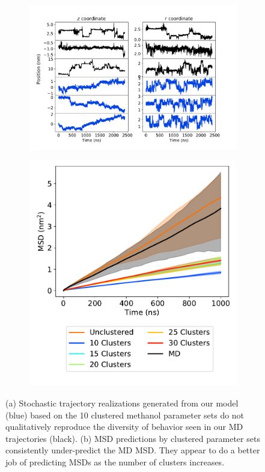 \documentclass[journal=jpcbfk,manuscript=article]{achemso}
\begin{document}
  \begin{figure}
  \centering
  \begin{subfigure}{0.63\textwidth}
  \includegraphics[width=\textwidth]{qualitative_clustered_MET_10.pdf}
  \caption{}\label{fig:qualitative_clustered_MET}
  \end{subfigure}
  \begin{subfigure}{0.35\textwidth}
  \vspace{2.25em}
  \includegraphics[width=\textwidth]{msd_nclusters.pdf}
  \caption{}\label{fig:clustered_MSD}
  \end{subfigure}
  \caption{(a) Stochastic trajectory realizations generated from our model 
  (blue) based on the 10 clustered methanol parameter sets do not qualitatively
  reproduce the diversity of behavior seen in our MD trajectories (black). 
  (b) MSD predictions by clustered parameter sets consistently under-predict 
  the MD MSD. They appear to do a better job of predicting MSDs as the number
  of clusters increases.}\label{fig:clustered_dynamics}
  \end{figure}
  
\end{document}

